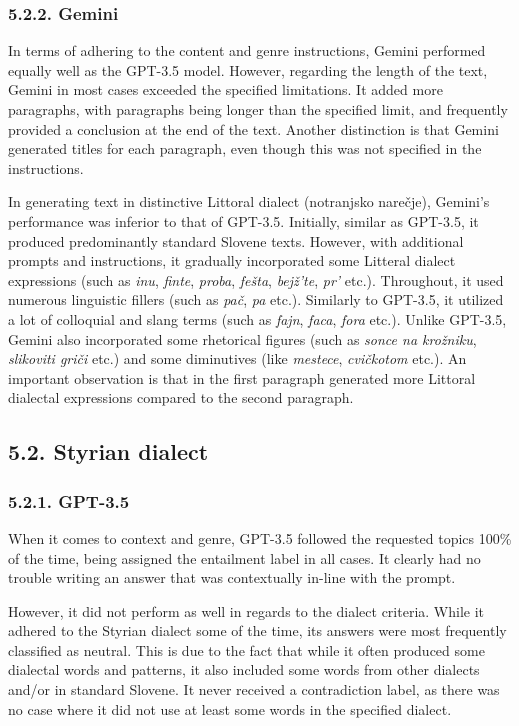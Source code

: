 \documentclass[fleqn,moreauthors,10pt]{ds_report}
\begin{document}
\subsubsection{5.2.2. Gemini}

    In terms of adhering to the content and genre instructions, Gemini performed equally well as the GPT-3.5 model. However, regarding the length of the text, Gemini in most cases exceeded the specified limitations. It added more paragraphs, with paragraphs being longer than the specified limit, and frequently provided a conclusion at the end of the text. Another distinction is that Gemini generated titles for each paragraph, even though this was not specified in the instructions. 

    In generating text in distinctive Littoral dialect (notranjsko narečje), Gemini's performance was inferior to that of GPT-3.5. Initially, similar as GPT-3.5, it produced predominantly standard Slovene texts. However, with additional prompts and instructions, it gradually incorporated some Litteral dialect expressions (such as \textit{inu}, \textit{finte}, \textit{proba}, \textit{fešta}, \textit{bejž'te}, \textit{pr' }etc.). Throughout, it used numerous linguistic fillers (such as \textit{pač}, \textit{pa} etc.). Similarly to GPT-3.5, it utilized a lot of colloquial and slang terms (such as \textit{fajn}, \textit{faca}, \textit{fora} etc.). Unlike GPT-3.5, Gemini also incorporated some rhetorical figures (such as \textit{sonce na krožniku}, \textit{slikoviti griči} etc.) and some diminutives (like \textit{mestece}, \textit{cvičkotom} etc.). An important observation is that in the first paragraph generated more Littoral  dialectal expressions compared to the second paragraph. 
    
\subsection{5.2. Styrian dialect}

\subsubsection{5.2.1. GPT-3.5}

    When it comes to context and genre, GPT-3.5 followed the requested topics 100\% of the time, being assigned the entailment label in all cases. It clearly had no trouble writing an answer that was contextually in-line with the prompt.

    However, it did not perform as well in regards to the dialect criteria. While it adhered to the Styrian dialect some of the time, its answers were most frequently classified as neutral. This is due to the fact that while it often produced some dialectal words and patterns, it also included some words from other dialects and/or in standard Slovene. It never received a contradiction label, as there was no case where it did not use at least some words in the specified dialect. 
\end{document}
